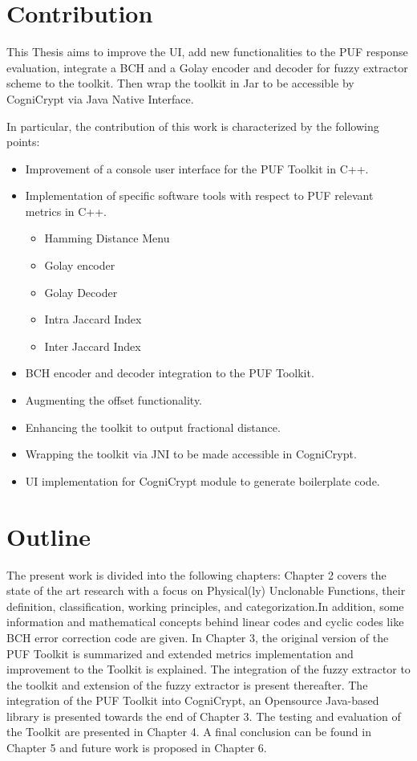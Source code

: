 \section{Contribution}
This Thesis aims to improve the UI, add new functionalities to the PUF response evaluation, integrate a BCH and a Golay encoder and decoder for fuzzy extractor scheme to the toolkit.
Then wrap the toolkit in Jar to be accessible by CogniCrypt via Java Native Interface.

In particular, the contribution of this work is characterized by the following points:

\begin{itemize}
	\item Improvement of a console user interface for the PUF Toolkit in C++.
	\item Implementation of specific software tools with respect to PUF relevant metrics in C++.
		\begin{itemize}
			\item Hamming Distance Menu
			\item Golay encoder 
			\item Golay Decoder
			\item Intra Jaccard Index
			\item Inter Jaccard Index
		\end{itemize}
	\item BCH encoder and decoder integration to the PUF Toolkit.
	\item Augmenting the offset functionality.
	\item Enhancing the toolkit to output fractional distance.
	\item Wrapping the toolkit via JNI to be made accessible in CogniCrypt.
	\item UI implementation for CogniCrypt module to generate boilerplate code.
\end{itemize}

\section{Outline}
The present work is divided into the following chapters: Chapter 2 covers the state of the art research with a focus on Physical(ly) Unclonable Functions, their definition, classification, working principles, and categorization.In addition, some information and mathematical concepts behind linear codes and cyclic codes like BCH error correction code are given. In Chapter 3, the original version of the PUF Toolkit is summarized and extended metrics implementation and improvement
to the Toolkit is explained. The integration of the fuzzy extractor to the toolkit and extension of the fuzzy extractor is present thereafter. The integration of the PUF Toolkit into CogniCrypt, an Opensource Java-based library is presented towards the end of Chapter 3. The testing and evaluation of the Toolkit are presented in Chapter 4. A final conclusion can be found in Chapter 5 and future work is proposed in Chapter 6.
